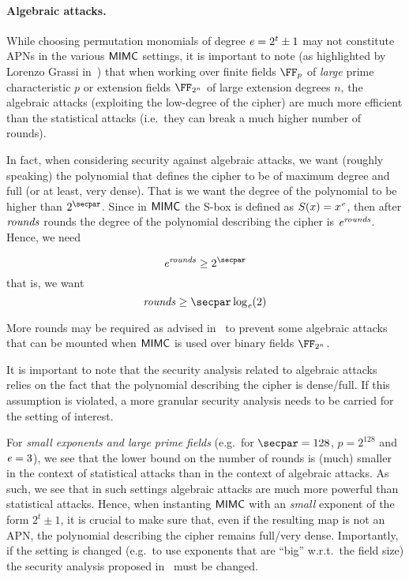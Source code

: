 \paragraph{Algebraic attacks.}

While choosing permutation monomials of degree $\mathit{e}{} = 2^t \pm 1$ may not constitute APNs in the various $\mathsf{MIMC{}}$ settings, it is important to note (as highlighted by Lorenzo Grassi in~\cite{mimc-security-communications}) that when working over finite fields $\FF_p$ of \emph{large} prime characteristic $p$ or extension fields $\FF_{2^n}$ of large extension degrees $n$, the algebraic attacks (exploiting the low-degree of the cipher) are much more efficient than the statistical attacks (i.e.~they can break a much higher number of rounds).

In fact, when considering security against algebraic attacks, we want (roughly speaking) the polynomial that defines the cipher to be of maximum degree and full (or at least, very dense). That is we want the degree of the polynomial to be higher than $2^{\secpar}$. Since in $\mathsf{MIMC{}}$ the S-box is defined as $S(x) = x^{\mathit{e}{}}$, then after $\mathit{rounds}$ rounds the degree of the polynomial describing the cipher is $\mathit{e}{}^{\mathit{rounds}}$. Hence, we need

\[
    \exponent{}^{\rounds} \geq 2^{\secpar}
\]
that is, we want
\[
    \rounds \geq \secpar \log_{\exponent}(2)
\]

\begin{remark}
    More rounds may be required as advised in~\cite{DBLP:conf/asiacrypt/Eichlseder0LORS20} to prevent some algebraic attacks that can be mounted when $\mathsf{MIMC{}}$ is used over binary fields $\FF_{2^n}$.
\end{remark}

It is important to note that the security analysis related to algebraic attacks relies on the fact that the polynomial describing the cipher is dense/full. If this assumption is violated, a more granular security analysis needs to be carried for the setting of interest.

\begin{notebox}
    For \emph{small exponents and large prime fields} (e.g.~for $\secpar = 128$, $p = 2^{128}$ and $\mathit{e}{} = 3$), we see that the lower bound on the number of rounds is (much) smaller in the context of statistical attacks than in the context of algebraic attacks. As such, we see that in such settings algebraic attacks are much more powerful than statistical attacks. Hence, when instanting $\mathsf{MIMC{}}$ with an \emph{small} exponent of the form $2^t \pm 1$, it is crucial to make sure that, even if the resulting map is not an APN, the polynomial describing the cipher remains full/very dense. Importantly, if the setting is changed (e.g.~to use exponents that are ``big'' w.r.t.~the field size) the security analysis proposed in~\cite{albrecht2016mimc} must be changed.
\end{notebox}

